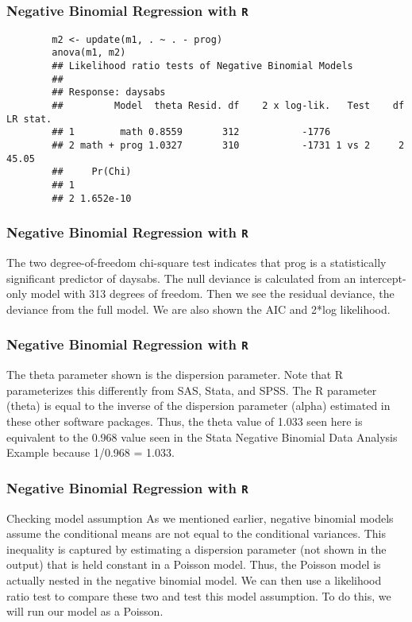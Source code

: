 \documentclass[00-GLMregslides.tex]{subfiles}
\begin{document}
\begin{frame}[fragile]
	\frametitle{Negative Binomial Regression with \texttt{R} }
	\Large
	\begin{framed}
		\begin{verbatim}	
		m2 <- update(m1, . ~ . - prog)
		anova(m1, m2)
		## Likelihood ratio tests of Negative Binomial Models
		## 
		## Response: daysabs
		##         Model  theta Resid. df    2 x log-lik.   Test    df LR stat.
		## 1        math 0.8559       312           -1776                      
		## 2 math + prog 1.0327       310           -1731 1 vs 2     2    45.05
		##     Pr(Chi)
		## 1          
		## 2 1.652e-10
		\end{verbatim}
	\end{framed}
\end{frame}
\begin{frame}[fragile]
	\frametitle{Negative Binomial Regression with \texttt{R} }
	\Large
	
	The two degree-of-freedom chi-square test indicates that prog is a statistically significant predictor of daysabs.
	The null deviance is calculated from an intercept-only model with 313 degrees of freedom. Then we see the residual deviance, the deviance from the full model. We are also shown the AIC and 2*log likelihood.
\end{frame}
\begin{frame}[fragile]
	\frametitle{Negative Binomial Regression with \texttt{R} }
	\Large
	The theta parameter shown is the dispersion parameter. Note that R parameterizes this differently from SAS, Stata, and SPSS. The R parameter (theta) is equal to the inverse of the dispersion parameter (alpha) estimated in these other software packages. Thus, the theta value of 1.033 seen here is equivalent to the 0.968 value seen in the Stata Negative Binomial Data Analysis Example because 1/0.968 = 1.033.
\end{frame}
\begin{frame}[fragile]
	\frametitle{Negative Binomial Regression with \texttt{R} }
	\Large
	
	Checking model assumption
	As we mentioned earlier, negative binomial models assume the conditional means are not equal to the conditional variances. This inequality is captured by estimating a dispersion parameter (not shown in the output) that is held constant in a Poisson model. Thus, the Poisson model is actually nested in the negative binomial model. We can then use a likelihood ratio test to compare these two and test this model assumption. To do this, we will run our model as a Poisson.
\end{frame}
\end{document}
